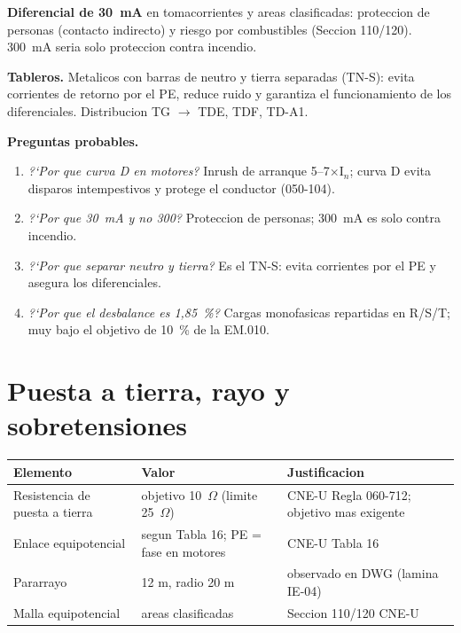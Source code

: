 \documentclass[12pt,letterpaper]{report}
\newcommand{\suheader}{\rowcolor{azulunap!14}}
\begin{document}
\textbf{Diferencial de 30~mA} en tomacorrientes y areas clasificadas: proteccion
de personas (contacto indirecto) y riesgo por combustibles (Seccion 110/120).
300~mA seria solo proteccion contra incendio.

\textbf{Tableros.} Metalicos con barras de neutro y tierra separadas (TN-S):
evita corrientes de retorno por el PE, reduce ruido y garantiza el funcionamiento
de los diferenciales. Distribucion TG \(\rightarrow\) TDE, TDF, TD-A1.

\textbf{Preguntas probables.}
\begin{enumerate}
\item \emph{?`Por que curva D en motores?} Inrush de arranque 5--7\(\times\)I\(_n\);
  curva D evita disparos intempestivos y protege el conductor (050-104).
\item \emph{?`Por que 30~mA y no 300?} Proteccion de personas; 300~mA es solo
  contra incendio.
\item \emph{?`Por que separar neutro y tierra?} Es el TN-S: evita corrientes por
  el PE y asegura los diferenciales.
\item \emph{?`Por que el desbalance es 1,85~\%?} Cargas monofasicas repartidas
  en R/S/T; muy bajo el objetivo de 10~\% de la EM.010.
\end{enumerate}

\section{Puesta a tierra, rayo y sobretensiones}

\begin{table}[H]
\centering
\small
\renewcommand{\arraystretch}{1.12}
\begin{tabularx}{\textwidth}{P{0.34\textwidth} P{0.20\textwidth} L}
\toprule
\suheader \textbf{Elemento} & \textbf{Valor} & \textbf{Justificacion} \\
\midrule
Resistencia de puesta a tierra & objetivo 10~\(\Omega\) (limite 25~\(\Omega\)) & CNE-U Regla 060-712; objetivo mas exigente \\
Enlace equipotencial & segun Tabla 16; PE = fase en motores & CNE-U Tabla 16 \\
Pararrayo & 12 m, radio 20 m & observado en DWG (lamina IE-04) \\
Malla equipotencial & areas clasificadas & Seccion 110/120 CNE-U \\
\bottomrule
\end{tabularx}
\end{table}
\end{document}
